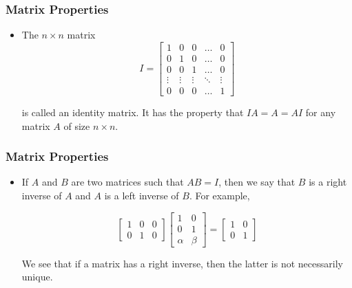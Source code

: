 \documentclass[notheorems,mathserif,table,compress]{beamer}  %
\begin{document}
\begin{frame}
\frametitle{Matrix Properties}
\begin{itemize}
\item The $n\times n$ matrix 
\begin{displaymath}
I=
\left[\begin{array}{ccccc}
1 & 0 & 0 & \ldots & 0 \\
0 & 1 & 0 & \ldots & 0 \\
0 & 0 & 1 & \ldots & 0 \\
\vdots & \vdots & \vdots & \ddots & \vdots \\
0 & 0 & 0 & \ldots & 1 
\end{array} \right]
\end{displaymath}

is called an \textsf{identity matrix}. It has the property that $IA=A=AI$ for any matrix $A$ of size $n\times n$. 
\end{itemize}
\end{frame}

\begin{frame}
\frametitle{Matrix Properties}
\begin{itemize}
\item If $A$ and $B$ are two matrices such that $AB=I$, then we say that $B$ is a \textsf{right inverse} of $A$ and $A$ is a \textsf{left inverse} of $B$. For example,

\begin{displaymath}
\begin{bmatrix}
1 & 0 & 0\\
0 & 1 & 0
\end{bmatrix} 
\begin{bmatrix}
1 & 0 \\
0 & 1\\
\alpha & \beta
\end{bmatrix}
=
\begin{bmatrix}
1 & 0 \\
0 & 1 
\end{bmatrix} 
\end{displaymath}

We see that if a matrix has a right inverse, then the latter is not necessarily unique.
\end{itemize}
\end{frame}
\end{document}
